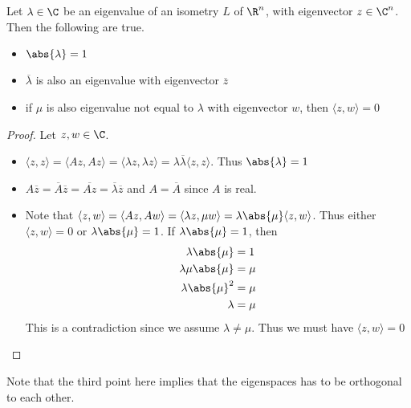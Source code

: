 \begin{prp}{}{} Let $\lambda\in\C$ be an eigenvalue of an isometry $L$ of $\R^n$, with eigenvector $z\in\C^n$. Then the following are true. 
\begin{itemize}
\item $\abs{\lambda}=1$
\item $\overline{\lambda}$ is also an eigenvalue with eigenvector $\overline{z}$
\item if $\mu$ is also eigenvalue not equal to $\lambda$ with eigenvector $w$, then $\langle z,w\rangle=0$
\end{itemize}\tcbline
\begin{proof} Let $z,w\in\C$. 
\begin{itemize}
\item $\langle z,z\rangle=\langle Az,Az\rangle=\langle\lambda z,\lambda z\rangle=\lambda\overline{\lambda}\langle z,z\rangle$. Thus $\abs{\lambda}=1$
\item $A\overline{z}=\overline{A}\overline{z}=\overline{Az}=\overline{\lambda}\overline{z}$ and $A=\overline{A}$ since $A$ is real. 
\item Note that $\langle z,w\rangle=\langle Az,Aw\rangle=\langle\lambda z,\mu w\rangle=\lambda\abs{\mu}\langle z,w\rangle$. Thus either $\langle z,w\rangle=0$ or $\lambda\abs{\mu}=1$. If $\lambda\abs{\mu}=1$, then
\begin{align*}
\lambda\abs{\mu}&=1\\
\lambda\mu\abs{\mu}&=\mu\\
\lambda\abs{\mu}^2&=\mu\\
\lambda&=\mu
\end{align*}
This is a contradiction since we assume $\lambda\neq\mu$. Thus we must have $\langle z,w\rangle=0$
\end{itemize}
\end{proof}
\end{prp}

Note that the third point here implies that the eigenspaces has to be orthogonal to each other. 


